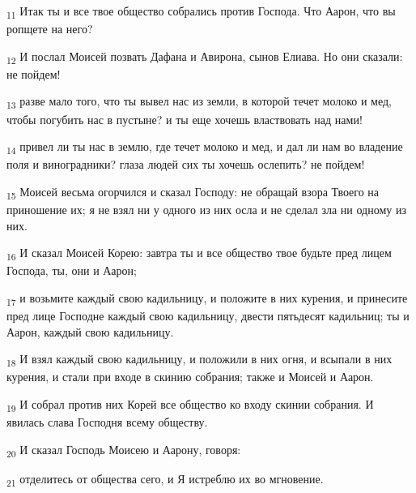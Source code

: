 \begin{tcolorbox}
\textsubscript{11} Итак ты и все твое общество собрались против Господа. Что Аарон, что вы ропщете на него?
\end{tcolorbox}
\begin{tcolorbox}
\textsubscript{12} И послал Моисей позвать Дафана и Авирона, сынов Елиава. Но они сказали: не пойдем!
\end{tcolorbox}
\begin{tcolorbox}
\textsubscript{13} разве мало того, что ты вывел нас из земли, в которой течет молоко и мед, чтобы погубить нас в пустыне? и ты еще хочешь властвовать над нами!
\end{tcolorbox}
\begin{tcolorbox}
\textsubscript{14} привел ли ты нас в землю, где течет молоко и мед, и дал ли нам во владение поля и виноградники? глаза людей сих ты хочешь ослепить? не пойдем!
\end{tcolorbox}
\begin{tcolorbox}
\textsubscript{15} Моисей весьма огорчился и сказал Господу: не обращай взора Твоего на приношение их; я не взял ни у одного из них осла и не сделал зла ни одному из них.
\end{tcolorbox}
\begin{tcolorbox}
\textsubscript{16} И сказал Моисей Корею: завтра ты и все общество твое будьте пред лицем Господа, ты, они и Аарон;
\end{tcolorbox}
\begin{tcolorbox}
\textsubscript{17} и возьмите каждый свою кадильницу, и положите в них курения, и принесите пред лице Господне каждый свою кадильницу, двести пятьдесят кадильниц; ты и Аарон, каждый свою кадильницу.
\end{tcolorbox}
\begin{tcolorbox}
\textsubscript{18} И взял каждый свою кадильницу, и положили в них огня, и всыпали в них курения, и стали при входе в скинию собрания; также и Моисей и Аарон.
\end{tcolorbox}
\begin{tcolorbox}
\textsubscript{19} И собрал против них Корей все общество ко входу скинии собрания. И явилась слава Господня всему обществу.
\end{tcolorbox}
\begin{tcolorbox}
\textsubscript{20} И сказал Господь Моисею и Аарону, говоря:
\end{tcolorbox}
\begin{tcolorbox}
\textsubscript{21} отделитесь от общества сего, и Я истреблю их во мгновение.
\end{tcolorbox}
